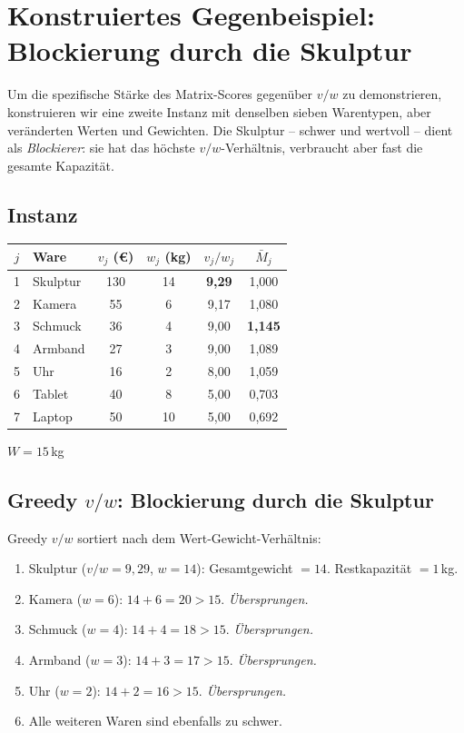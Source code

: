 \documentclass[a4paper,11pt]{article}
\begin{document}
\section{Konstruiertes Gegenbeispiel: Blockierung durch die Skulptur}
\label{sec:gegen}

Um die spezifische Stärke des Matrix-Scores gegenüber $v/w$
zu demonstrieren, konstruieren wir eine zweite Instanz mit
denselben sieben Warentypen, aber veränderten Werten und Gewichten.
Die Skulptur -- schwer und wertvoll -- dient als
\emph{Blockierer}: sie hat das höchste $v/w$-Verhältnis,
verbraucht aber fast die gesamte Kapazität.

\subsection{Instanz}

\begin{center}
\renewcommand{\arraystretch}{1.2}
\begin{tabular}{clcccc}
\toprule
$j$ & Ware & $v_j$ (\euro) & $w_j$ (kg) & $v_j/w_j$ & $\bar{M}_j$ \\
\midrule
\rowcolor{redlight}
1 & Skulptur & 130 & 14 & \textbf{9{,}29} & 1{,}000 \\
2 & Kamera   &  55 &  6 & 9{,}17 & 1{,}080 \\
3 & Schmuck  &  36 &  4 & 9{,}00 & \textbf{1{,}145} \\
4 & Armband  &  27 &  3 & 9{,}00 & 1{,}089 \\
5 & Uhr      &  16 &  2 & 8{,}00 & 1{,}059 \\
6 & Tablet   &  40 &  8 & 5{,}00 & 0{,}703 \\
7 & Laptop   &  50 & 10 & 5{,}00 & 0{,}692 \\
\bottomrule
\end{tabular}
\quad $W = 15$\,kg
\end{center}

\subsection{Greedy $v/w$: Blockierung durch die Skulptur}

Greedy $v/w$ sortiert nach dem Wert-Gewicht-Verhältnis:
\begin{enumerate}[topsep=2pt]
  \item Skulptur ($v/w = 9{,}29$, $w=14$): Gesamtgewicht $= 14$.
    Restkapazität $= 1$\,kg.
  \item Kamera ($w=6$): $14 + 6 = 20 > 15$. \textit{Übersprungen.}
  \item Schmuck ($w=4$): $14 + 4 = 18 > 15$. \textit{Übersprungen.}
  \item Armband ($w=3$): $14 + 3 = 17 > 15$. \textit{Übersprungen.}
  \item Uhr ($w=2$): $14 + 2 = 16 > 15$. \textit{Übersprungen.}
  \item[\vdots] Alle weiteren Waren sind ebenfalls zu schwer.
\end{enumerate}
\end{document}
